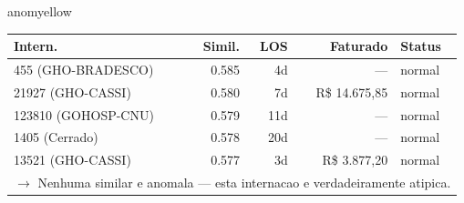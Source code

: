 \documentclass[a4paper,10pt]{article}
\begin{document}
\begin{anomalycard}[Internacao 166687 | GHO-PETROBRAS | MODERADO (z=2.59)]{anomyellow}
\begin{tabular}{l r r r l}\toprule\textbf{Intern.} & \textbf{Simil.} & \textbf{LOS} & \textbf{Faturado} & \textbf{Status} \\\midrule
455 (GHO-BRADESCO) & 0.585 & 4d & --- & \textcolor{jcubeblue}{normal} \\
21927 (GHO-CASSI) & 0.580 & 7d & R\$ 14.675,85 & \textcolor{jcubeblue}{normal} \\
123810 (GOHOSP-CNU) & 0.579 & 11d & --- & \textcolor{jcubeblue}{normal} \\
1405 (Cerrado) & 0.578 & 20d & --- & \textcolor{jcubeblue}{normal} \\
13521 (GHO-CASSI) & 0.577 & 3d & R\$ 3.877,20 & \textcolor{jcubeblue}{normal} \\
\multicolumn{5}{l}{\textcolor{jcubeblue}{\small $\rightarrow$ Nenhuma similar e anomala --- esta internacao e verdadeiramente atipica.}} \\
\bottomrule\end{tabular}


\end{anomalycard}

\newpage
\end{document}
